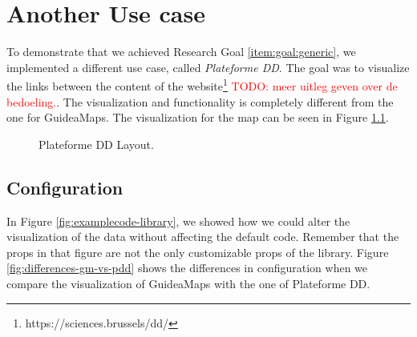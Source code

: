 \chapter{Another Use case}\label{ch:usecase}
To demonstrate that we achieved Research Goal \ref{item:goal:generic}, we implemented a different use case, called \textit{Plateforme DD}. The goal was to visualize the links between the content of the website\footnote{https://sciences.brussels/dd/} \textcolor{red}{TODO: meer uitleg geven over de bedoeling.}. The visualization and functionality is completely different from the one for GuideaMaps. The visualization for the map can be seen in Figure \ref{fig:plateforme-dd}.\\

\begin{figure}[H]
	\centering
	\caption{Plateforme DD Layout.}
	\label{fig:plateforme-dd}
\end{figure}



\section{Configuration}\label{sec:usecase-configuration}
In Figure \ref{fig:examplecode-library}, we showed how we could alter the visualization of the data without affecting the default code. Remember that the props in that figure are not the only customizable props of the library. Figure \ref{fig:differences-gm-vs-pdd} shows the differences in configuration when we compare the visualization of GuideaMaps with the one of Plateforme DD.

